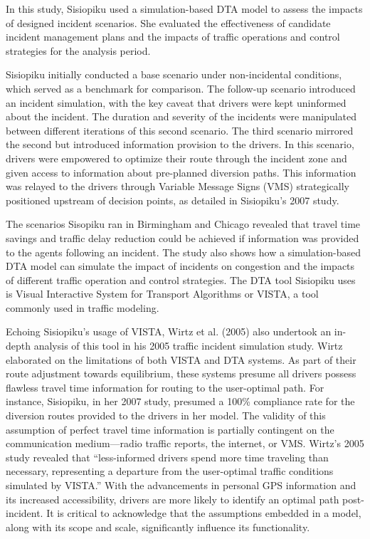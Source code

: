 \documentclass[fancy, oneside, mastersfancy, ms]{byuthesis}
\begin{document}
In this study, Sisiopiku used a simulation-based DTA model to assess the
impacts of designed incident scenarios. She evaluated the effectiveness
of candidate incident management plans and the impacts of traffic
operations and control strategies for the analysis period.

Sisiopiku initially conducted a base scenario under non-incidental
conditions, which served as a benchmark for comparison. The follow-up
scenario introduced an incident simulation, with the key caveat that
drivers were kept uninformed about the incident. The duration and
severity of the incidents were manipulated between different iterations
of this second scenario. The third scenario mirrored the second but
introduced information provision to the drivers. In this scenario,
drivers were empowered to optimize their route through the incident zone
and given access to information about pre-planned diversion paths. This
information was relayed to the drivers through Variable Message Signs
(VMS) strategically positioned upstream of decision points, as detailed
in Sisiopiku's 2007 study.

The scenarios Sisopiku ran in Birmingham and Chicago revealed that
travel time savings and traffic delay reduction could be achieved if
information was provided to the agents following an incident. The study
also shows how a simulation-based DTA model can simulate the impact of
incidents on congestion and the impacts of different traffic operation
and control strategies. The DTA tool Sisiopiku uses is Visual
Interactive System for Transport Algorithms or VISTA, a tool commonly
used in traffic modeling.

Echoing Sisiopiku's usage of VISTA, Wirtz et al. (2005) also undertook
an in-depth analysis of this tool in his 2005 traffic incident
simulation study. Wirtz elaborated on the limitations of both VISTA and
DTA systems. As part of their route adjustment towards equilibrium,
these systems presume all drivers possess flawless travel time
information for routing to the user-optimal path. For instance,
Sisiopiku, in her 2007 study, presumed a 100\% compliance rate for the
diversion routes provided to the drivers in her model. The validity of
this assumption of perfect travel time information is partially
contingent on the communication medium---radio traffic reports, the
internet, or VMS. Wirtz's 2005 study revealed that ``less-informed
drivers spend more time traveling than necessary, representing a
departure from the user-optimal traffic conditions simulated by VISTA.''
With the advancements in personal GPS information and its increased
accessibility, drivers are more likely to identify an optimal path
post-incident. It is critical to acknowledge that the assumptions
embedded in a model, along with its scope and scale, significantly
influence its functionality.
\end{document}
